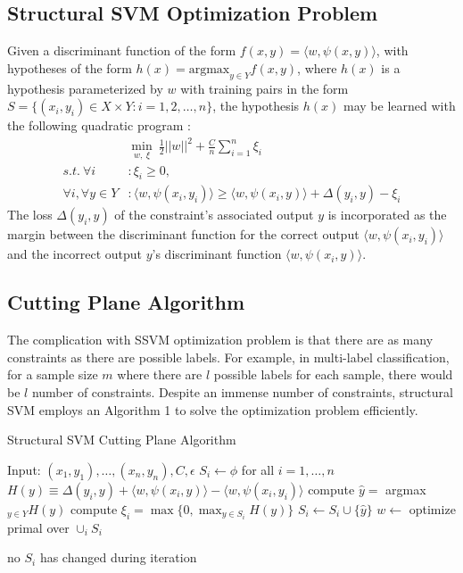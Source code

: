 \subsection{Structural SVM Optimization Problem}
Given a discriminant function of the form $f(x, y) = \langle w, \psi (x, y)\rangle$, with hypotheses of the form $h(x) = \text{argmax}_{y \in Y} f(x, y)$, where $h(x)$ is a hypothesis parameterized by $w$ with training pairs in the form $S = \{(x_i, y_i) \in X \times Y : i = 1,2,\ldots,n\}$, the hypothesis $h(x)$ may be learned with the following quadratic program \cite{Finley2009} :
\begin{align}
&\min _{w, \ \xi} \ \frac{1}{2}||w||^2 + \frac{C}{n}\sum_{i=1}^{n} \xi _i \\
s.t.\ \forall i&: \xi _i \geq 0,\\
\forall i, \forall y \in Y&: \langle w, \psi (x_i, y_i) \rangle \geq \langle w, \psi(x_i, y) \rangle + \Delta(y_i, y) - \xi _i
\end{align}
The loss $\Delta(y_i, y)$ of the constraint’s associated output $y$ is incorporated as the margin between the discriminant function for the correct output $\langle w, \psi(x_i, y_i)\rangle$ and the incorrect output $y$\rq s discriminant function $\langle w, \psi(x_i, y)\rangle$.

\subsection{Cutting Plane Algorithm}
The complication with SSVM optimization problem is that there are as many constraints as there are possible labels. For example, in multi-label classification, for a sample size $m$ where there are $l$ possible labels for each sample, there would be $l$ number of constraints. Despite an immense number of constraints, structural SVM employs an Algorithm 1 to solve the optimization problem efficiently.

\begin{algorithm}
\caption{Structural SVM Cutting Plane Algorithm}
\begin{algorithmic}[1]
\State Input: $(x_1, y_1), \ldots, (x_n, y_n), C, \epsilon $
\State $ S_i \gets \phi$ for all $i = 1, \ldots, n$
\Repeat
{}
	\State $H(y) \equiv \Delta(y_i, y) + \langle w, \psi (x_i, y) \rangle - \langle w, \psi (x_i, y_i) \rangle$
	\State compute $\hat{y} = $ argmax$_{y \in Y} H(y)$
	\State compute $\xi _i = \max \{0, \max _{y\in S_i} H(y) \}$
		\State $S_i \gets S_i \cup \{\hat{y}\}$
		\State $w \gets $ optimize primal over $\cup _i S_i$
	\EndIf
	
\EndFor
\Until no $S_i$ has changed during iteration
\end{algorithmic}
\end{algorithm}

